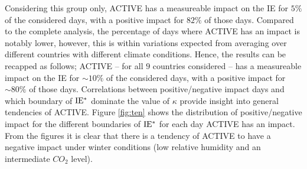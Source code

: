 \documentclass[fleqn,usenatbib,nofootinbib]{revtex4-2}
\begin{document}
	Considering this group only, ACTIVE has a measureable impact on the IE for $5\%$ of the considered days, with a positive impact for $82\%$ of those days. Compared to the complete analysis, the percentage of days where ACTIVE has an impact is notably lower, however, this is within variations expected from averaging over different countries with different climate conditions. Hence, the results can be recapped as follows; ACTIVE -- for all $9$ countries considered -- has a measureable impact on the IE for $\sim 10\%$ of the considered days, with a positive impact for $\sim 80\%$ of those days.\newline
	Correlations between positive/negative impact days and which boundary of $\rm IE^*$ dominate the value of $\kappa$ provide insight into general tendencies of ACTIVE. Figure \ref{fig:ten} shows the distribution of positive/negative impact for the different boundaries of $\rm IE^*$ for each day ACTIVE has an impact. From the figures it is clear that there is a tendency of ACTIVE to have a negative impact under winter conditions (low relative humidity and an intermediate $CO_2$ level).
\end{document}

